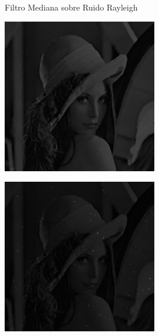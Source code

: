 \documentclass{beamer}
\begin{document}
\begin{frame}[fragile]{Filtro Mediana sobre Ruido Rayleigh}
	\begin{minipage}{0.25\linewidth}
		\centering
		\includegraphics[width=\linewidth]{../results/lena_rayleigh_xi1_mediana}
	\end{minipage}\hfill
	\begin{minipage}{0.25\linewidth}
		\centering
		\includegraphics[width=\linewidth]{../results/lena_rayleigh_xi2_mediana}

\end{minipage}
\end{frame}
\end{document}
